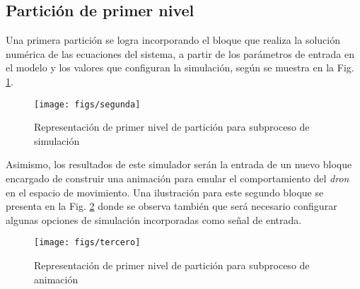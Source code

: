 \subsection*{Partición de primer nivel}
Una primera partición se logra incorporando el bloque que realiza la solución numérica de las ecuaciones del sistema, a partir de los parámetros de entrada en el modelo y los valores que configuran la simulación, según se muestra en la Fig. \ref{1212}.\\
\begin{figure}
\centering
\caption[]{Representación de primer nivel de partición para subproceso de simulación}\label{1212}
\texttt{[image: figs/segunda]}
\end{figure}

Asimismo, los resultados de este simulador serán la entrada de un nuevo bloque encargado de construir una animación para emular el comportamiento del \emph{dron} en el espacio de movimiento. Una ilustración para este segundo bloque se presenta en la Fig. \ref{1213} donde se observa también que será necesario configurar algunas opciones de simulación incorporadas como señal de entrada.\\
\begin{figure}
\centering
\caption[]{Representación de primer nivel de partición para subproceso de animación}\label{1213}
\texttt{[image: figs/tercero]}
\end{figure}

